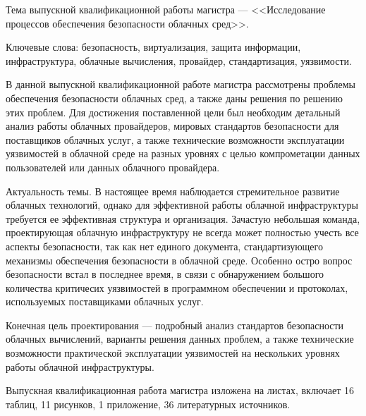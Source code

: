 
Тема выпускной квалификационной работы магистра --- <<Исследование процессов обеспечения безопасности облачных сред>>.

Ключевые слова: безопасность, виртуализация, защита информации, инфраструктура, облачные вычисления, провайдер, стандартизация, уязвимости.

В данной выпускной квалификационной работе магистра рассмотрены проблемы обеспечения безопасности облачных сред, а также даны решения по решению этих проблем.
Для достижения поставленной цели был необходим детальный анализ работы облачных провайдеров, мировых стандартов безопасности для поставщиков облачных услуг, а также технические возможности эксплуатации уязвимостей в облачной среде на разных уровнях с целью компрометации данных пользователей или данных облачного провайдера.

Актуальность темы.
В настоящее время наблюдается стремительное развитие облачных технологий, однако для эффективной работы облачной инфраструктуры требуется ее эффективная структура и организация.
Зачастую небольшая команда, проектирующая облачную инфраструктуру не всегда может полностью учесть все аспекты безопасности, так как нет единого документа, стандартизующего механизмы обеспечения безопасности в облачной среде.
Особенно остро вопрос безопасности встал в последнее время, в связи с обнаружением большого количества критичесих уязвимостей в программном обеспечении и протоколах, используемых поставщиками облачных услуг.

Конечная цель проектирования --- подробный анализ стандартов безопасности облачных вычислений, варианты решения данных проблем, а также технические возможности практической эксплуатации уязвимостей на нескольких уровнях работы облачной инфраструктуры.

Выпускная квалификационная работа магистра изложена на \pageref{LastPage} листах, включает 16 таблиц, 11 рисунков, 1 приложение, 36 литературных источников.

\clearpage

